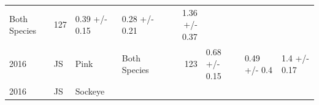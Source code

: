 \documentclass[fleqn,10pt]{wlpeerj} %
\begin{document}
\begin{longtable}[]{@{}llllrlll@{}}
\begin{minipage}[t]{0.11\columnwidth}
Both Species\strut
\end{minipage} & \begin{minipage}[t]{0.04\columnwidth}\raggedleft\strut
127\strut
\end{minipage} & \begin{minipage}[t]{0.14\columnwidth}\raggedright\strut
0.39 +/- 0.15\strut
\end{minipage} & \begin{minipage}[t]{0.14\columnwidth}\raggedright\strut
0.28 +/- 0.21\strut
\end{minipage} & \begin{minipage}[t]{0.14\columnwidth}\raggedright\strut
1.36 +/- 0.37\strut
\end{minipage}\tabularnewline
\begin{minipage}[t]{0.09\columnwidth}\raggedright\strut
2016\strut
\end{minipage} & \begin{minipage}[t]{0.06\columnwidth}\raggedright\strut
JS\strut
\end{minipage} & \begin{minipage}[t]{0.06\columnwidth}\raggedright\strut
Pink\strut
\end{minipage} & \begin{minipage}[t]{0.11\columnwidth}\raggedright\strut
Both Species\strut
\end{minipage} & \begin{minipage}[t]{0.04\columnwidth}\raggedleft\strut
123\strut
\end{minipage} & \begin{minipage}[t]{0.14\columnwidth}\raggedright\strut
0.68 +/- 0.15\strut
\end{minipage} & \begin{minipage}[t]{0.14\columnwidth}\raggedright\strut
0.49 +/- 0.4\strut
\end{minipage} & \begin{minipage}[t]{0.14\columnwidth}\raggedright\strut
1.4 +/- 0.17\strut
\end{minipage}\tabularnewline
\begin{minipage}[t]{0.09\columnwidth}\raggedright\strut
2016\strut
\end{minipage} & \begin{minipage}[t]{0.06\columnwidth}\raggedright\strut
JS\strut
\end{minipage} & \begin{minipage}[t]{0.06\columnwidth}\raggedright\strut
Sockeye\strut
\end{minipage} & \begin{minipage}[t]{0.11\columnwidth}\raggedright\strut

\end{minipage}
\end{longtable}
\end{document}
